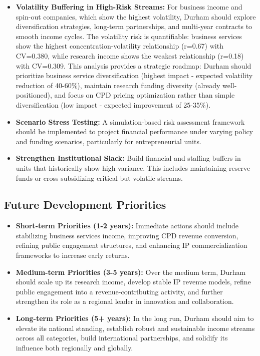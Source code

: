 \documentclass[journal,onecolumn, 10pt,draftclsnofoot]{IEEEtran}
\begin{document}
\begin{itemize}
    \item \textbf{Volatility Buffering in High-Risk Streams:} For business income and spin-out companies, which show the highest volatility, Durham should explore diversification strategies, long-term partnerships, and multi-year contracts to smooth income cycles. The volatility risk is quantifiable: business services show the highest concentration-volatility relationship (r=0.67) with CV=0.380, while research income shows the weakest relationship (r=0.18) with CV=0.309. This analysis provides a strategic roadmap: Durham should prioritize business service diversification (highest impact - expected volatility reduction of 40-60\%), maintain research funding diversity (already well-positioned), and focus on CPD pricing optimization rather than simple diversification (low impact - expected improvement of 25-35\%).
    
    \item \textbf{Scenario Stress Testing:} A simulation-based risk assessment framework should be implemented to project financial performance under varying policy and funding scenarios, particularly for entrepreneurial units.
    
    \item \textbf{Strengthen Institutional Slack:} Build financial and staffing buffers in units that historically show high variance. This includes maintaining reserve funds or cross-subsidizing critical but volatile streams.
\end{itemize}

\subsection{Future Development Priorities}

\begin{itemize}
    \item \textbf{Short-term Priorities (1-2 years):} Immediate actions should include stabilizing business services income, improving CPD revenue conversion, refining public engagement structures, and enhancing IP commercialization frameworks to increase early returns.
    
    \item \textbf{Medium-term Priorities (3-5 years):} Over the medium term, Durham should scale up its research income, develop stable IP revenue models, refine public engagement into a revenue-contributing activity, and further strengthen its role as a regional leader in innovation and collaboration.
    
    \item \textbf{Long-term Priorities (5+ years):} In the long run, Durham should aim to elevate its national standing, establish robust and sustainable income streams across all categories, build international partnerships, and solidify its influence both regionally and globally.
\end{itemize}
\end{document}
